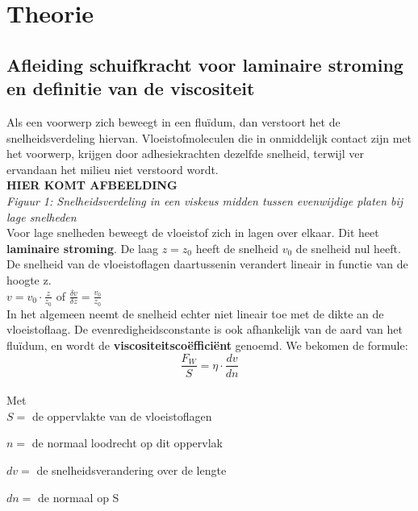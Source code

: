 \section{Theorie}

\subsection{Afleiding schuifkracht voor laminaire stroming en 
definitie van de viscositeit}

Als een voorwerp zich beweegt in een flu\"idum, dan verstoort het de snelheidsverdeling hiervan.
Vloeistofmoleculen die in onmiddelijk contact zijn met het voorwerp, krijgen door 
adhesiekrachten dezelfde snelheid, terwijl ver ervandaan het milieu niet verstoord wordt.\\

\textbf{HIER KOMT AFBEELDING}
\\

\textit{Figuur 1: Snelheidsverdeling in een viskeus midden tussen evenwijdige platen bij lage snelheden}\\

Voor lage snelheden beweegt de vloeistof zich in lagen over elkaar. Dit heet \textbf{laminaire stroming}.
De laag $z = z_{0}$ heeft de snelheid $v_{0}$ de snelheid nul heeft. De snelheid van de 
vloeistoflagen daartussenin verandert lineair in functie van de hoogte z.
\\

$v = v_{0} \cdot \frac{z}{z_{0}}$ of $\frac{\delta v}{\delta z} = \frac{v_{0}}{z_{0}}$
\\

In het algemeen neemt de snelheid echter niet lineair toe met de dikte an de vloeistoflaag. 
De evenredigheidsconstante is ook afhankelijk van de aard van het flu\"idum, en wordt de
\textbf{viscositeitsco\"effici\"ent} genoemd. We bekomen de formule:
\\

$$\frac{F_{W}}{S} = \eta \cdot \frac{dv}{dn}$$
\\

Met
\\

$S=$ de oppervlakte van de vloeistoflagen

$n=$ de normaal loodrecht op dit oppervlak

$dv=$ de snelheidsverandering over de lengte

$dn=$ de normaal op S
\\

